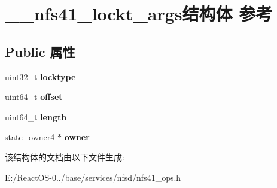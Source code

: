 \hypertarget{struct____nfs41__lockt__args}{}\section{\+\_\+\+\_\+nfs41\+\_\+lockt\+\_\+args结构体 参考}
\label{struct____nfs41__lockt__args}
\subsection*{Public 属性}
\begin{DoxyCompactItemize}
\item 
\mbox{\label{struct____nfs41__lockt__args_af5e3b50131f41177970ac22ae5b0dd3c}} 
uint32\+\_\+t {\bfseries locktype}
\item 
\mbox{\label{struct____nfs41__lockt__args_a9a165f654cacdb644190b3e262b79017}} 
uint64\+\_\+t {\bfseries offset}
\item 
\mbox{\label{struct____nfs41__lockt__args_a6028e112b7a01cb34781f903ca89f1dd}} 
uint64\+\_\+t {\bfseries length}
\item 
\mbox{\label{struct____nfs41__lockt__args_aef98bce38108470d1c6968e33d144e1a}} 
\hyperlink{struct____state__owner4}{state\+\_\+owner4} $\ast$ {\bfseries owner}
\end{DoxyCompactItemize}


该结构体的文档由以下文件生成\+:\begin{DoxyCompactItemize}
\item 
E\+:/\+React\+O\+S-\/0../base/services/nfsd/nfs41\+\_\+ops.\+h\end{DoxyCompactItemize}
